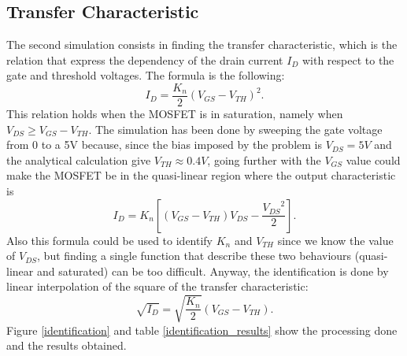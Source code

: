 \documentclass[11pt,a4paper]{article}
\begin{document}
	\subsection{Transfer Characteristic}
	The second simulation consists in finding the transfer characteristic, which is the relation that express the dependency of the drain current \(I_D\) with respect to the gate and threshold voltages. The formula is the following: 
	\begin{equation} \label{trans_char}
	I_D = \frac{K_n}{2}(V_{GS}-V_{TH})^2.
	\end{equation}
	This relation holds when the MOSFET is in saturation, namely when $V_{DS} \geq V_{GS}-V_{TH}$. The simulation has been done by sweeping the gate voltage from 0 to a 5V because, since the bias imposed by the problem is $V_{DS} = 5V$ and the analytical calculation give $V_{TH} \approx 0.4V$, going further with the $V_{GS}$ value could make the MOSFET be in the quasi-linear region where the output characteristic is 
	\begin{equation} \label{output_char}
	I_D = K_n \left[\left(V_{GS}-V_{TH}\right)V_{DS}-\frac{{V_{DS}}^2}{2}\right].
	\end{equation}
	Also this formula could be used to identify $K_n$ and $V_{TH}$ since we know the value of $V_{DS}$, but finding a single function that describe these two behaviours (quasi-linear and saturated) can be too difficult. Anyway, the identification is done by linear interpolation of the square of the transfer characteristic: 
	\begin{equation} \label{sqr_trans_char}
		\sqrt{I_D} = \sqrt{\frac{K_n}{2}}(V_{GS}-V_{TH}).
	\end{equation} 
	Figure \ref*{identification} and table \ref*{identification_results} show the processing done and the results obtained.
\end{document}
